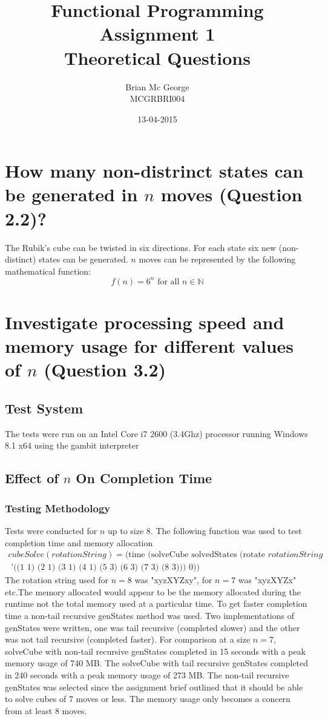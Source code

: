 \documentclass[]{article}
\title{Functional Programming Assignment 1\\Theoretical Questions}
\date{13-04-2015}
\author{Brian Mc George\\MCGRBRI004
}
\begin{document}
\maketitle
\newpage

\section{How many non-distrinct states can be generated in \(n\) moves (Question 2.2)?}
The Rubik's cube can be twisted in six directions. For each state six new (non-distinct) states can be generated. \(n\) moves can be represented by the following mathematical function:
\begin{equation}\label{func_states}	
	f(n)=6^n\text{ for all }n \in\mathbb{N}
\end{equation}

\section{Investigate processing speed and memory usage for different values of \(n\) (Question 3.2)}
\subsection{Test System}
The tests were run on an Intel Core i7 2600 (3.4Ghz) processor running Windows 8.1 x64 using the gambit interpreter

\subsection{Effect of \(n\) On Completion Time}
\subsubsection{Testing Methodology}
Tests were conducted for \(n\) up to size 8.
The following function was used to test completion time and memory allocation\begin{equation*}\begin{split}
cubeSolve(rotationString) = \text{(time (solveCube solvedStates (rotate }rotationString \\\text{ '((1 1) (2 1) (3 1) (4 1) (5 3) (6 3) (7 3) (8 3))) 0))}
\end{split}\end{equation*}
The rotation string used for \(n = 8\) was "xyzXYZxy", for \(n = 7\) was "xyzXYZx" etc.\newline\newline The memory allocated would appear to be the memory allocated during the runtime not the total memory used at a particular time. To get faster completion time a non-tail recursive genStates method was used. Two implementations of genStates were written, one was tail recursive (completed slower) and the other was not tail recursive (completed faster). For comparison at a size \(n = 7\), solveCube with non-tail recursive genStates completed in 15 seconds with a peak memory usage of 740 MB. The solveCube with tail recursive genStates completed in 240 seconds with a peak memory usage of 273 MB. The non-tail recursive genStates was selected since the assignment brief outlined that it should be able to solve cubes of 7 moves or less. The memory usage only becomes a concern from at least 8 moves.
\end{document}
